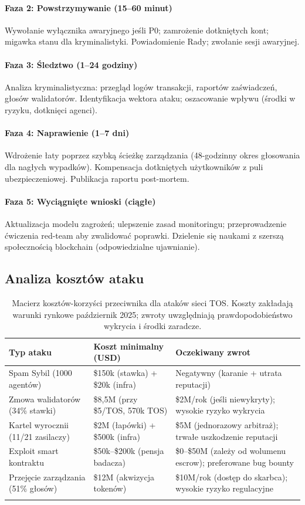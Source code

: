 \documentclass[11pt]{article}
\begin{document}
\paragraph{Faza 2: Powstrzymywanie (15--60 minut)}
Wywołanie wyłącznika awaryjnego jeśli P0; zamrożenie dotkniętych kont; migawka stanu dla kryminalistyki. Powiadomienie Rady; zwołanie sesji awaryjnej.

\paragraph{Faza 3: Śledztwo (1--24 godziny)}
Analiza kryminalistyczna: przegląd logów transakcji, raportów zaświadczeń, głosów walidatorów. Identyfikacja wektora ataku; oszacowanie wpływu (środki w ryzyku, dotknięci agenci).

\paragraph{Faza 4: Naprawienie (1--7 dni)}
Wdrożenie łaty poprzez szybką ścieżkę zarządzania (48-godzinny okres głosowania dla nagłych wypadków). Kompensacja dotkniętych użytkowników z puli ubezpieczeniowej. Publikacja raportu post-mortem.

\paragraph{Faza 5: Wyciągnięte wnioski (ciągłe)}
Aktualizacja modelu zagrożeń; ulepszenie zasad monitoringu; przeprowadzenie ćwiczenia red-team aby zwalidować poprawki. Dzielenie się naukami z szerszą społecznością blockchain (odpowiedzialne ujawnianie).

\subsection{Analiza kosztów ataku}

\begin{longtable}{@{}p{}p{}p{}@{}}
\toprule
\textbf{Typ ataku} & \textbf{Koszt minimalny (USD)} & \textbf{Oczekiwany zwrot} \\\midrule
Spam Sybil (1000 agentów) & \$150k (stawka) + \$20k (infra) & Negatywny (karanie + utrata reputacji) \\
Zmowa walidatorów (34\% stawki) & \$8,5M (przy \$5/TOS, 570k TOS) & \$2M/rok (jeśli niewykryty); wysokie ryzyko wykrycia \\
Kartel wyrocznii (11/21 zasilaczy) & \$2M (łapówki) + \$500k (infra) & \$5M (jednorazowy arbitraż); trwałe uszkodzenie reputacji \\
Exploit smart kontraktu & \$50k--\$200k (pensja badacza) & \$0--\$50M (zależy od wolumenu escrow); preferowane bug bounty \\
Przejęcie zarządzania (51\% głosów) & \$12M (akwizycja tokenów) & \$10M/rok (dostęp do skarbca); wysokie ryzyko regulacyjne \\
\bottomrule
\caption{Macierz kosztów-korzyści przeciwnika dla ataków sieci TOS. Koszty zakładają warunki rynkowe październik 2025; zwroty uwzględniają prawdopodobieństwo wykrycia i środki zaradcze.}
\end{longtable}
\end{document}
